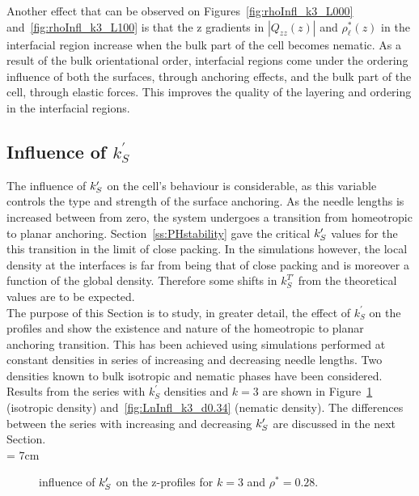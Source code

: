 Another effect that can be observed on Figures~\ref{fig:rhoInfl_k3_L000} and~\ref{fig:rhoInfl_k3_L100}
is that the z gradients in $|Q_{zz}(z)|$ and $\rho^{*}_\ell(z)$ in the interfacial region increase 
when  the bulk part of the cell becomes nematic.  As a result of the bulk orientational order, 
interfacial 
regions come under the ordering influence of both the surfaces, through anchoring effects, and the 
bulk part of the cell, through elastic forces. This improves the quality of the layering and 
ordering in the interfacial regions.


\subsection{Influence of $k^{\prime}_S$}
\label{ss:LnInfluence}

The influence of $k_S^{\prime}$ on the cell's behaviour is considerable, as this variable
controls the type and strength of the surface anchoring.
%
As the needle lengths is increased
between from zero, the system undergoes a transition from homeotropic 
to planar anchoring. Section~\ref{ss:PHstability} gave the critical $k_S^{\prime}$ values
for the this transition in the limit of close packing.
%
In the simulations however, the local density at the interfaces is far from being 
that of close packing and is moreover a function of the global density. Therefore some 
shifts in $k_S^{T\prime}$ from the theoretical values are to be expected.\\
%
The purpose of this Section is to study,  in greater detail, the effect of $k^\prime_S$
on the profiles and show the existence and nature of the homeotropic to planar anchoring
transition.
This has been achieved
using simulations performed at constant densities  in series of increasing and decreasing 
needle lengths. 
Two densities known to bulk isotropic and nematic phases have been considered.
Results from the series with $k^\prime_S$ densities and $k=3$ are shown in 
Figure~\ref{fig:LnInfl_k3_d0.28} (isotropic density) and~\ref{fig:LnInfl_k3_d0.34} (nematic
density). The differences between the series with increasing and decreasing $k_S^{\prime}$ are discussed
in the next Section.\\

\picW = 7cm
\begin{figure}
        \centering
	\caption{influence of $k_S^{\prime}$ on the z-profiles for $k=3$ and $\rho^{*} = 0.28$.}
	\label{fig:LnInfl_k3_d0.28}
\end{figure}


